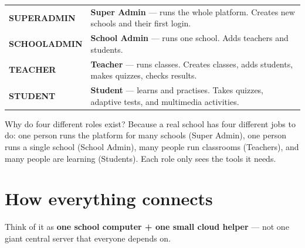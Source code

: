 \documentclass[12pt,a4paper]{article}
\begin{document}
\begin{center}
\renewcommand{\arraystretch}{1.35}
\begin{tabularx}{\linewidth}{@{}>{\centering\arraybackslash}p{2.4cm} X@{}}
\rowcolor{eduPurpleLight}
\textbf{\textcolor{eduPurple}{\large SUPER\newline ADMIN}} & \textbf{Super Admin} --- runs the whole platform. Creates new schools and their first login. \\[4pt]
\rowcolor{eduBlueLight}
\textbf{\textcolor{eduBlue}{\large SCHOOL\newline ADMIN}} & \textbf{School Admin} --- runs one school. Adds teachers and students. \\[4pt]
\rowcolor{eduGreenLight}
\textbf{\textcolor{eduGreen}{\large TEACHER}} & \textbf{Teacher} --- runs classes. Creates classes, adds students, makes quizzes, checks results. \\[4pt]
\rowcolor{eduYellowLight}
\textbf{\textcolor{eduYellow!80!black}{\large STUDENT}} & \textbf{Student} --- learns and practises. Takes quizzes, adaptive tests, and multimedia activities. \\
\end{tabularx}
\end{center}

\begin{qabox}{Why do four different roles exist?}
Because a real school has four different jobs to do: one person runs the platform for
many schools (Super Admin), one person runs a single school (School Admin), many
people run classrooms (Teachers), and many people are learning (Students). Each
role only sees the tools it needs.
\end{qabox}

\section*{How everything connects}
Think of it as \textbf{one school computer + one small cloud helper} --- not one giant
central server that everyone depends on.
\end{document}
